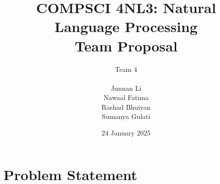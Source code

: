 \documentclass[titlepage]{article}
\title{COMPSCI 4NL3: Natural Language Processing\\Team Proposal}
\author{Team 4\\
\\ Junnan Li
\\ Nawaal Fatima
\\ Rashad Bhuiyan
\\ Sumanya Gulati}
\date{24 January 2025}
\begin{document}
\begin{titlepage}
    \maketitle
\end{titlepage}

\newpage 

\tableofcontents
\listoftables
\listoffigures

\newpage

\section{Problem Statement}
\end{document}
